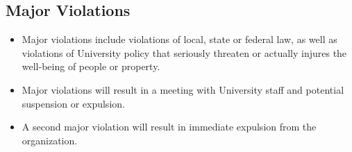 \subsection{Major Violations}
\begin{itemize}
	\item Major violations include violations of local, state or federal law, as well as violations of University policy that seriously threaten or actually injures the well-being of people or property.
	\item Major violations will result in a meeting with University staff and potential suspension or expulsion.
	\item A second major violation will result in immediate expulsion from the organization.
\end{itemize}


